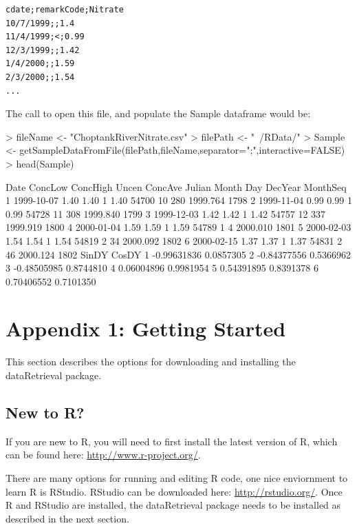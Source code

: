 \documentclass[a4paper,11pt]{article}
\begin{document}
\begin{verbatim}
cdate;remarkCode;Nitrate
10/7/1999;;1.4
11/4/1999;<;0.99
12/3/1999;;1.42
1/4/2000;;1.59
2/3/2000;;1.54
...
\end{verbatim}
The call to open this file, and populate the Sample dataframe would be:
\begin{Schunk}
\begin{Sinput}
> fileName <- "ChoptankRiverNitrate.csv"
> filePath <-  "~/RData/"
> Sample <- getSampleDataFromFile(filePath,fileName,separator=";",interactive=FALSE)
> head(Sample)
\end{Sinput}
\begin{Soutput}
        Date ConcLow ConcHigh Uncen ConcAve Julian Month Day  DecYear MonthSeq
1 1999-10-07    1.40     1.40     1    1.40  54700    10 280 1999.764     1798
2 1999-11-04    0.99     0.99     1    0.99  54728    11 308 1999.840     1799
3 1999-12-03    1.42     1.42     1    1.42  54757    12 337 1999.919     1800
4 2000-01-04    1.59     1.59     1    1.59  54789     1   4 2000.010     1801
5 2000-02-03    1.54     1.54     1    1.54  54819     2  34 2000.092     1802
6 2000-02-15    1.37     1.37     1    1.37  54831     2  46 2000.124     1802
        SinDY     CosDY
1 -0.99631836 0.0857305
2 -0.84377556 0.5366962
3 -0.48505985 0.8744810
4  0.06004896 0.9981954
5  0.54391895 0.8391378
6  0.70406552 0.7101350
\end{Soutput}
\end{Schunk}


\newpage
\section{Appendix 1: Getting Started}
This section describes the options for downloading and installing the dataRetrieval package.

\subsection{New to R?}
If you are new to R, you will need to first install the latest version of R, which can be found here: \url{http://www.r-project.org/}.

There are many options for running and editing R code, one nice enviornment to learn R is RStudio. RStudio can be downloaded here: \url{http://rstudio.org/}. Once R and RStudio are installed, the dataRetrieval package needs to be installed as described in the next section.
\end{document}
